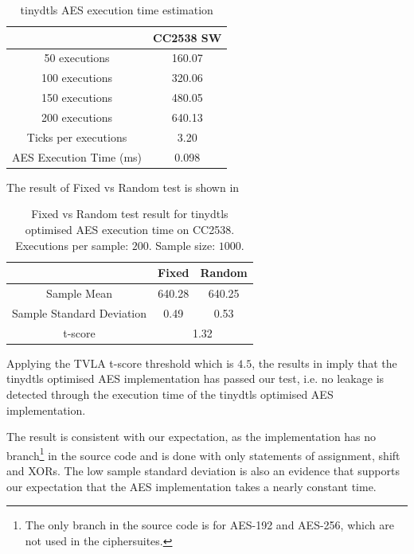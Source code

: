 \begin{table}[ht!]
	\center
	\begin{tabular}{|c|c|}
		\hline
		                        & CC2538 SW \\ \hline
		50 executions           & 160.07          \\ \hline
		100 executions          & 320.06          \\ \hline
		150 executions          & 480.05          \\ \hline
		200 executions          & 640.13          \\ \hline
		Ticks per executions    & 3.20            \\ \hline
		AES Execution Time (ms) & 0.098           \\ \hline
	\end{tabular}
	\caption{tinydtls AES execution time estimation}
	\label{Tbl: tinydtls AES execution time estimation}
\end{table}

The result of Fixed vs Random test is shown in 

\begin{table}[ht!]
	\center
	\begin{tabular}{|c|c|c|}
		\hline
		                         & Fixed       & Random      \\ \hline
		Sample Mean              & 640.28      & 640.25      \\ \hline
		Sample Standard Deviation & 0.49        & 0.53        \\ \hline
		t-score                  & \multicolumn{2}{c|}{1.32} \\ \hline
	\end{tabular}
	\caption{Fixed vs Random test result for tinydtls optimised AES execution time on CC2538. Executions per sample: $200$. Sample size: $1000$.}
	\label{Tbl: Fixed vs Random test result for tinydtls AES execution time on CC2538}
\end{table}

Applying the TVLA t-score threshold which is $4.5$, the results in  imply that the tinydtls optimised AES implementation has passed our test, i.e. no leakage is detected through the execution time of the tinydtls optimised AES implementation. 

The result is consistent with our expectation, as the implementation has no branch\footnote{The only branch in the source code is for AES-192 and AES-256, which are not used in the ciphersuites.} in the source code and is done with only statements of assignment, shift and XORs. The low sample standard deviation is also an evidence that supports our expectation that the AES implementation takes a nearly constant time.


